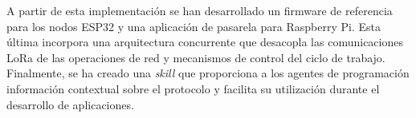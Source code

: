 A partir de esta implementación se han desarrollado un firmware de referencia para los nodos ESP32 y una aplicación de pasarela para Raspberry Pi. Esta última incorpora una arquitectura concurrente que desacopla las comunicaciones LoRa de las operaciones de red y mecanismos de control del ciclo de trabajo. Finalmente, se ha creado una \textit{skill} que proporciona a los agentes de programación información contextual sobre el protocolo y facilita su utilización durante el desarrollo de aplicaciones.